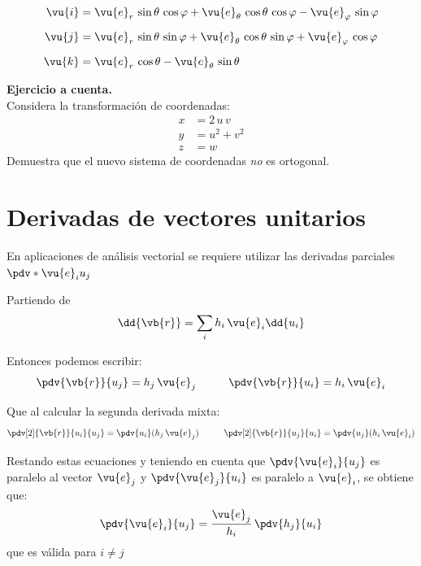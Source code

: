 \begin{align*}
\vu{i} &= \vu{e}_{r} \, \sin \theta \, \cos \varphi + \vu{e}_{\theta} \, \cos \theta \, \cos \varphi - \vu{e}_{\varphi} \, \sin \varphi \\[0.5em]
\vu{j} &= \vu{e}_{r} \, \sin \theta \, \sin \varphi + \vu{e}_{\theta} \, \cos \theta \, \sin \varphi + \vu{e}_{\varphi} \, \cos \varphi \\[0.5em]
\vu{k} &= \vu{e}_{r} \, \cos \theta - \vu{e}_{\theta} \, \sin \theta
\end{align*}
\par
\textbf{Ejercicio a cuenta.}
\\
Considera la transformación de coordenadas:
\begin{align*}
x &= 2 \, u \, v \\[0.5em]
y &= u^{2} + v^{2} \\[0.5em]
z &= w
\end{align*}
Demuestra que el nuevo sistema de coordenadas \emph{no} es ortogonal.

\section{Derivadas de vectores unitarios}

En aplicaciones de análisis vectorial se requiere utilizar las derivadas parciales $\pdv*{\vu{e}_{i}}{u_{j}}$
\par
Partiendo de
\begin{align*}
\dd{\vb{r}} = \sum_{i} h_{i} \, \vu{e}_{i} \dd{u_{i}}
\end{align*}
\par
Entonces podemos escribir:
\begin{align*}
\pdv{\vb{r}}{u_{j}} = h_{j} \, \vu{e}_{j} \hspace{1cm} \pdv{\vb{r}}{u_{i}} = h_{i} \, \vu{e}_{i}
\end{align*}
\par
Que al calcular la segunda derivada mixta:
\begin{align*}
\pdv[2]{\vb{r}}{u_{i}}{u_{j}} = \pdv{u_{i}} (h_{j} \, \vu{e}_{j}) \hspace{1cm} \pdv[2]{\vb{r}}{u_{j}}{u_{i}} = \pdv{u_{j}} (h_{i} \, \vu{e}_{i})
\end{align*}

Restando estas ecuaciones y teniendo en cuenta que $\pdv{\vu{e}_{i}}{u_{j}}$ es paralelo al vector $\vu{e}_{j}$ y $\pdv{\vu{e}_{j}}{u_{i}}$ es paralelo a $\vu{e}_{i}$, se obtiene que:
\begin{align*}
\pdv{\vu{e}_{i}}{u_{j}} = \dfrac{\vu{e}_{j}}{h_{i}} \, \pdv{h_{j}}{u_{i}}
\end{align*}
que es válida para $i \neq j$


